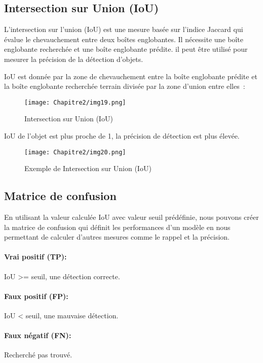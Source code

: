           \subsection{Intersection sur Union (IoU)}
          L'intersection sur l'union (IoU) est une mesure basée sur l'indice Jaccard qui évalue le chevauchement entre deux boîtes englobantes. Il nécessite une boîte englobante recherchée et une boîte englobante prédite. il peut être utilisé pour mesurer la précision de la détection d'objets.

          IoU est donnée par la zone de chevauchement entre la boîte englobante prédite et la boîte englobante recherchée terrain divisée par la zone d'union entre elles :
          \begin{figure}[H]
               \centering
               \texttt{[image: Chapitre2/img19.png]}
               \caption{Intersection sur Union (IoU)}
               \label{img19}
               \end{figure}

          IoU de l'objet est plus proche de 1, la précision de détection est plus élevée.
          \begin{figure}[H]
               \centering
               \texttt{[image: Chapitre2/img20.png]}
               \caption{Exemple de Intersection sur Union (IoU)}
               \label{img20}
               \end{figure}

          \subsection{Matrice de confusion}
          En utilisant la valeur calculée IoU avec valeur seuil prédéfinie, nous pouvons créer la matrice de confusion qui définit les performances d'un modèle en nous permettant de calculer d'autres mesures comme le rappel et la précision.
          \paragraph{Vrai positif (TP):} IoU >= seuil, une détection correcte. 
          \paragraph{Faux positif (FP):} IoU < seuil, une mauvaise détection.
          \paragraph{Faux négatif (FN):} Recherché pas trouvé.
